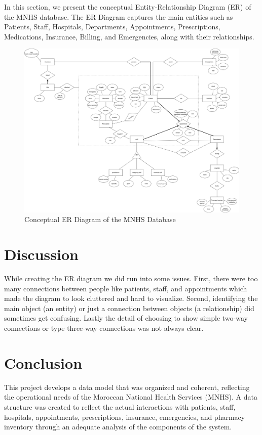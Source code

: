 \documentclass[a4paper,12pt]{article}
\begin{document}
In this section, we present the conceptual Entity-Relationship Diagram (ER) of the MNHS database. The ER Diagram captures the main entities such as Patients, Staff, Hospitals, Departments, Appointments, Prescriptions, Medications, Insurance, Billing, and Emergencies, along with their relationships.

\begin{figure}[H]
    \centering
    \includegraphics[width=\textwidth]{Figures/ERDFinalFinal.png}
    \caption{Conceptual ER Diagram of the MNHS Database}
    \label{fig:erd}
\end{figure}

\section{Discussion}
While creating the ER diagram we did run into some issues. First, there were too many connections between people like patients, staff, and appointments which made the diagram to look cluttered and hard to visualize. Second, identifying the main object (an entity) or just a connection between objects (a relationship) did sometimes get confusing. Lastly the detail of choosing to show simple two-way connections or type three-way connections was not always clear.

\section{Conclusion}
This project develops a data model that was organized and coherent, reflecting the operational needs of the Moroccan National Health Services (MNHS). A data structure was created to reflect the actual interactions with patients, staff, hospitals, appointments, prescriptions, insurance, emergencies, and pharmacy inventory through an adequate analysis of the components of the system. 
\end{document}
